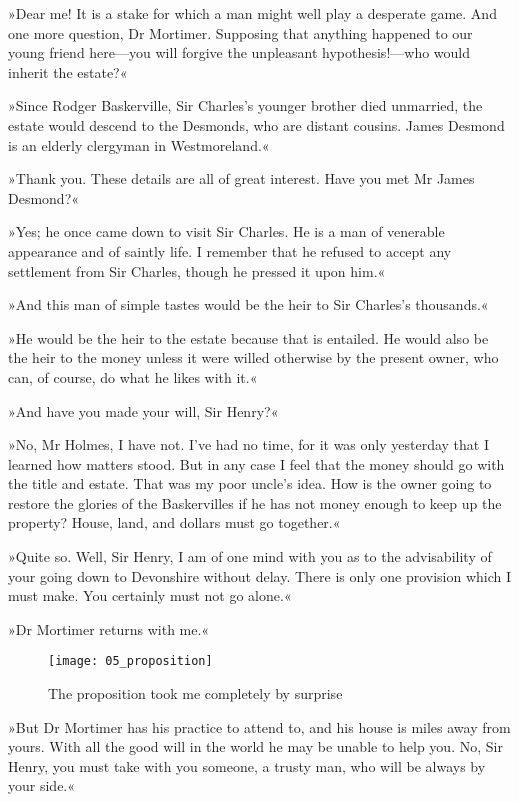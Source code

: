 »Dear me! It is a stake for which a man might well play a desperate game. And one more question, Dr Mortimer. Supposing that anything happened to our young friend here—you will forgive the unpleasant hypothesis!—who would inherit the estate?«

»Since Rodger Baskerville, Sir Charles's younger brother died unmarried, the estate would descend to the Desmonds, who are distant cousins. James Desmond is an elderly clergyman in Westmoreland.«

»Thank you. These details are all of great interest. Have you met Mr James Desmond?«

»Yes; he once came down to visit Sir Charles. He is a man of venerable appearance and of saintly life. I remember that he refused to accept any settlement from Sir Charles, though he pressed it upon him.«

»And this man of simple tastes would be the heir to Sir Charles's thousands.«

»He would be the heir to the estate because that is entailed. He would also be the heir to the money unless it were willed otherwise by the present owner, who can, of course, do what he likes with it.«

»And have you made your will, Sir Henry?«

»No, Mr Holmes, I have not. I've had no time, for it was only yesterday that I learned how matters stood. But in any case I feel that the money should go with the title and estate. That was my poor uncle's idea. How is the owner going to restore the glories of the Baskervilles if he has not money enough to keep up the property? House, land, and dollars must go together.«

»Quite so. Well, Sir Henry, I am of one mind with you as to the advisability of your going down to Devonshire without delay. There is only one provision which I must make. You certainly must not go alone.«

»Dr Mortimer returns with me.«


\begin{figure}[t!h]
\centering
\texttt{[image: 05\_proposition]}
\caption{The proposition took me completely by surprise}
\end{figure}

»But Dr Mortimer has his practice to attend to, and his house is miles away from yours. With all the good will in the world he may be unable to help you. No, Sir Henry, you must take with you someone, a trusty man, who will be always by your side.«

